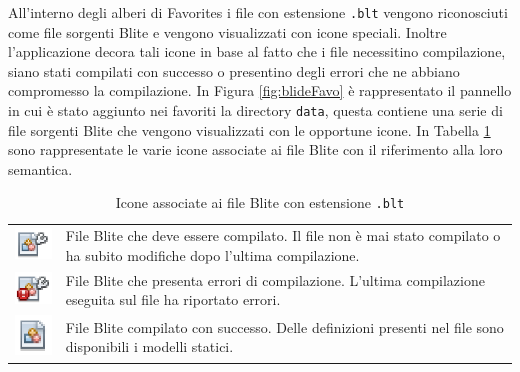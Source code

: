 All'interno degli alberi di Favorites i file con estensione
\texttt{.blt} vengono riconosciuti come file sorgenti Blite e vengono
visualizzati con icone speciali. Inoltre l'applicazione decora tali icone in
base al fatto che i file necessitino compilazione, siano stati compilati con
successo o presentino degli errori che ne abbiano compromesso la compilazione.
In Figura \ref{fig:blideFavo} è rappresentato il pannello in cui è stato aggiunto nei
favoriti la directory \texttt{data}, questa contiene una serie di file sorgenti
Blite che vengono visualizzati con le opportune icone. In Tabella
\ref{tab:bicons} sono rappresentate le varie icone associate ai file Blite con il riferimento alla loro semantica.  
\\

\begin{table}
\begin{center}
\begin{tabular}{cp{}}
\includegraphics{blide/dia/biconto} & File Blite che deve essere compilato. Il
file non è mai stato compilato o ha subito modifiche dopo l'ultima
compilazione.\\ \includegraphics{blide/dia/biconko} & File Blite che presenta
errori di compilazione. L'ultima compilazione eseguita sul file ha riportato errori.\\
\includegraphics{blide/dia/biconok} & File Blite compilato con successo.
Delle definizioni presenti nel file sono disponibili i modelli statici.\\
\end{tabular}
\caption{Icone associate ai file Blite con estensione \texttt{.blt}}
\label{tab:bicons}
\end{center}
\end{table}

